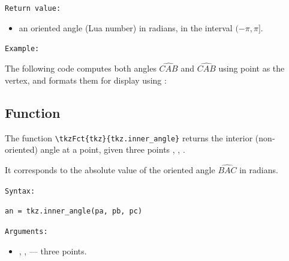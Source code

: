 \texttt{Return value:}
\begin{itemize}
  \item an oriented angle (Lua number) in radians, in the interval $(-\pi, \pi]$.
\end{itemize}

\medskip

\texttt{Example: }

The following code computes both angles $ \widehat{CAB}$ and $ \widehat{CAB}$ using point  as the vertex, and formats them for display using :


\begin{tkzexample}[latex = .5\textwidth]
\begin{center}
\end{center}
\end{tkzexample}



\subsection{Function }
\label{sub:tkz_inner_angle}

The function \verb|\tkzFct{tkz}{tkz.inner_angle}| returns the interior (non-oriented) angle
at a point, given three points , , .

It corresponds to the absolute value of the oriented angle $\widehat{BAC}$ in radians.

\medskip
\texttt{Syntax: }

\begin{mybox}
\verb|an = tkz.inner_angle(pa, pb, pc)|
\end{mybox}

\texttt{Arguments:}
\begin{itemize}
  \item {}, ,  — three points.
\end{itemize}

